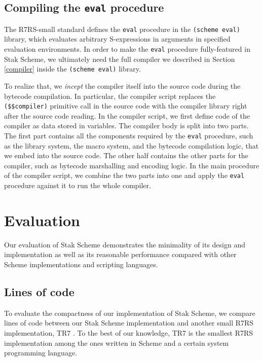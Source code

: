 \documentclass[sigplan, anonymous, review]{acmart}
\begin{document}
\subsection{Compiling the \texttt{eval} procedure} \label{inception}

The R7RS-small standard defines the \texttt{eval} procedure in the
\texttt{(scheme eval)} library, which evaluates arbitrary S-expressions in
arguments in specified evaluation environments.
In order to make the \texttt{eval} procedure fully-featured in Stak Scheme, we
ultimately need the full compiler we described in Section
\ref{compiler} inside the \texttt{(scheme eval)} library.

To realize that, we \textit{incept} the compiler itself into the
source code during the bytecode compilation.
In particular, the compiler script replaces
the \texttt{(\$\$compiler)} primitive call in the source code
with the compiler library right after the source code reading.
In the compiler script, we first define code of the compiler as
data stored in variables.
The compiler body is split into two parts.
The first part contains all the components required by the \texttt{eval}
procedure, such as the library system, the macro system, and the
bytecode compilation logic, that we embed into the source code.
The other half contains the other parts for the compiler, such
as bytecode marshalling and encoding logic.
In the main procedure of the compiler script, we combine the two
parts into one and apply the \texttt{eval} procedure against it to
run the whole compiler.

\section{Evaluation} \label{evaluation}

Our evaluation of Stak Scheme demonstrates the minimality of its design and
implementation as well as its reasonable performance compared with
other Scheme implementations and scripting languages.

\subsection{Lines of code}

To evaluate the compactness of our implementation of Stak Scheme,
we compare lines of code between our Stak Scheme implementation and
another small R7RS implementation, TR7 \cite{tr7}.
To the best of our knowledge, TR7 is the smallest R7RS implementation
among the ones written in Scheme and a certain system programming language.
\end{document}
